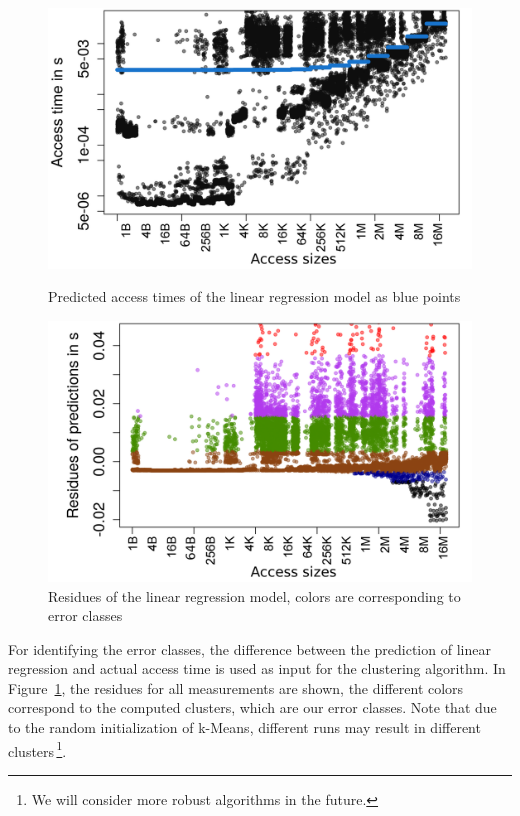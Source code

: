 \documentclass{superfri}
\begin{document}
	\begin{figure}[!h]
		\centering
		\begin{minipage}[b]{0.47\textwidth}
			\includegraphics[width=\textwidth]{src/plot_rnd_linreg_Size.png}
			\caption{Predicted access times of the linear regression model as blue points}
			\label{linreg}
		\end{minipage}
		\hfill
		\begin{minipage}[b]{0.47\textwidth}
			\includegraphics[width=\textwidth]{src/linreg_error_clustering_rnd_all.png}
			\caption{Residues of the linear regression model, colors are corresponding to error classes}
			\label{clustering}
		\end{minipage}
	\end{figure}
	
	For identifying the error classes, the difference between the prediction of linear regression and actual access time is used as input for the clustering algorithm.
	In Figure~\ref{clustering}, the residues for all measurements are shown, the different colors correspond to the computed clusters, which are our error classes. 
	Note that due to the random initialization of k-Means, different runs may result in different clusters\,\footnote{We will consider more robust algorithms in the future.}.
	
\end{document}
